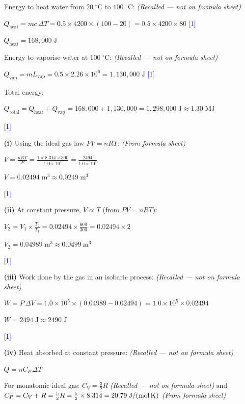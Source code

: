 \documentclass[12pt,a4paper]{article}
\newcommand{\markstep}[1]{\hfill\textcolor{blue}{[#1]}}
\newcommand{\finalanswer}[1]{%
  \begin{tcolorbox}[colback=green!5!white,colframe=green!50!black,boxrule=0.5pt]
  #1
  \end{tcolorbox}
}
\newcommand{\fromsheet}{\textit{(From formula sheet)}}
\newcommand{\recalled}{\textit{(Recalled --- not on formula sheet)}}
\begin{document}
\begin{parts}

\item Energy to heat water from $20\;^\circ\text{C}$ to $100\;^\circ\text{C}$: \recalled

$Q_{\text{heat}} = mc\,\Delta T = 0.5\times 4200\times (100 - 20) = 0.5\times 4200\times 80$ \markstep{1}

$Q_{\text{heat}} = 168{,}000\;\text{J}$

Energy to vaporise water at $100\;^\circ\text{C}$: \recalled

$Q_{\text{vap}} = mL_{\text{vap}} = 0.5\times 2.26\times 10^6 = 1{,}130{,}000\;\text{J}$ \markstep{1}

Total energy:

\finalanswer{$Q_{\text{total}} = Q_{\text{heat}} + Q_{\text{vap}} = 168{,}000 + 1{,}130{,}000 = 1{,}298{,}000\;\text{J} \approx 1.30\;\text{MJ}$} \markstep{1}

\item

\textbf{(i)} Using the ideal gas law $PV = nRT$: \fromsheet

$V = \frac{nRT}{P} = \frac{1\times 8.314\times 300}{1.0\times 10^5} = \frac{2494}{1.0\times 10^5}$

\finalanswer{$V = 0.02494\;\text{m}^3 \approx 0.0249\;\text{m}^3$} \markstep{1}

\textbf{(ii)} At constant pressure, $V \propto T$ (from $PV = nRT$):

$V_2 = V_1\times\frac{T_2}{T_1} = 0.02494\times\frac{600}{300} = 0.02494\times 2$

\finalanswer{$V_2 = 0.04989\;\text{m}^3 \approx 0.0499\;\text{m}^3$} \markstep{1}

\textbf{(iii)} Work done by the gas in an isobaric process: \recalled

$W = P\,\Delta V = 1.0\times 10^5\times(0.04989 - 0.02494) = 1.0\times 10^5\times 0.02494$

\finalanswer{$W = 2494\;\text{J} \approx 2490\;\text{J}$} \markstep{1}

\textbf{(iv)} Heat absorbed at constant pressure: \recalled

$Q = nC_P\,\Delta T$

For monatomic ideal gas: $C_V = \frac{3}{2}R$ \recalled{} and $C_P = C_V + R = \frac{5}{2}R = \frac{5}{2}\times 8.314 = 20.79\;\text{J/(mol\,K)}$ \fromsheet


\end{parts}
\end{document}

